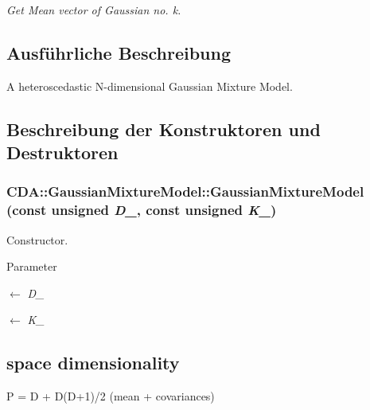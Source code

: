 \begin{DoxyCompactItemize}
\begin{DoxyCompactList}\small\item\em Get Mean vector of Gaussian no. k. \item\end{DoxyCompactList}\end{DoxyCompactItemize}


\subsection{Ausführliche Beschreibung}
A heteroscedastic N-\/dimensional Gaussian Mixture Model. 

\subsection{Beschreibung der Konstruktoren und Destruktoren}
\hypertarget{classCDA_1_1GaussianMixtureModel_a5921b8eb76badb1c21f18da585fde8ce}{
\subsubsection[{GaussianMixtureModel}]{\setlength{\rightskip}{0pt plus 5cm}CDA::GaussianMixtureModel::GaussianMixtureModel (const unsigned {\em D\_\-}, \/  const unsigned {\em K\_\-})}}
\label{classCDA_1_1GaussianMixtureModel_a5921b8eb76badb1c21f18da585fde8ce}


Constructor. 


\begin{DoxyParams}{Parameter}
\item[\mbox{$\leftarrow$} {\em D\_\-}]\item[\mbox{$\leftarrow$} {\em K\_\-}]\end{DoxyParams}
\hypertarget{classCDA_1_1GaussianMixtureModel_Parameter}{}\subsection{space dimensionality}\label{classCDA_1_1GaussianMixtureModel_Parameter}
P = D + D(D+1)/2 (mean + covariances) 

